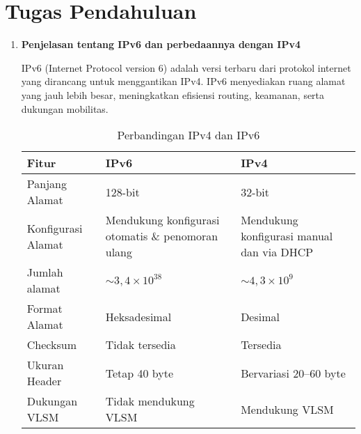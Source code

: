 \section{Tugas Pendahuluan}
\begin{enumerate}
	\item \textbf{Penjelasan tentang IPv6 dan perbedaannya dengan IPv4}

	IPv6 (Internet Protocol version 6) adalah versi terbaru dari protokol internet yang dirancang untuk menggantikan IPv4. IPv6 menyediakan ruang alamat yang jauh lebih besar, meningkatkan efisiensi routing, keamanan, serta dukungan mobilitas.

	\begin{table}[h!]
		\centering
		\begin{tabular}{|p{4cm}|p{5.2cm}|p{5.2cm}|}
			\hline
			\textbf{Fitur} & \textbf{IPv6} & \textbf{IPv4} \\
			\hline
			Panjang Alamat & 128-bit & 32-bit \\
			\hline
			Konfigurasi Alamat & Mendukung konfigurasi otomatis \& penomoran ulang & Mendukung konfigurasi manual dan via DHCP \\
			\hline
			 Jumlah alamat & \(\sim 3{,}4 \times 10^{38}\) &  \(\sim 4{,}3 \times 10^9\)\\
	\hline

			Format Alamat & Heksadesimal & Desimal \\
			\hline
			Checksum & Tidak tersedia & Tersedia \\
			\hline
			Ukuran Header & Tetap 40 byte & Bervariasi 20–60 byte \\
			\hline
			Dukungan VLSM & Tidak mendukung VLSM & Mendukung VLSM \\
			\hline	
		\end{tabular}
		\caption{Perbandingan IPv4 dan IPv6}
	\end{table}


\end{enumerate}
